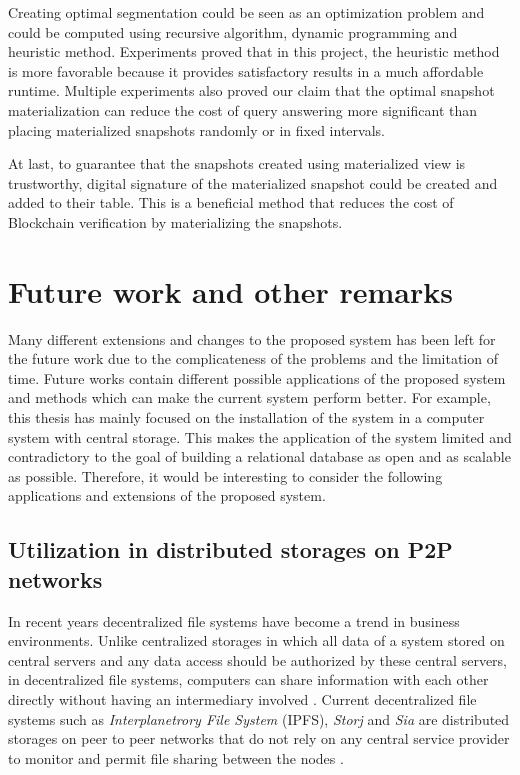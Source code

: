 		Creating optimal segmentation could be seen as an optimization problem and could be computed using recursive algorithm, dynamic programming and heuristic method. Experiments proved that in this project, the heuristic method is more favorable because it provides satisfactory results in a much affordable runtime. Multiple experiments also proved our claim that the optimal snapshot materialization can reduce the cost of query answering more significant than placing materialized snapshots randomly or in fixed intervals.

		At last, to guarantee that the snapshots created using materialized view is trustworthy, digital signature of the materialized snapshot could be created and added to their table. This is a beneficial method that reduces the cost of Blockchain verification by materializing the snapshots.

	\section{Future work and other remarks}
		Many different extensions and changes to the proposed system has been left for the future work due to the complicateness of the problems and the limitation of time. Future works contain different possible applications of the proposed system and methods which can make the current system perform better. For example, this thesis has mainly focused on the installation of the system in a computer system with central storage. This makes the application of the system limited and contradictory to the goal of building a relational database as open and as scalable as possible. Therefore, it would be interesting to consider the following applications and extensions of the proposed system.
		\subsection {Utilization in distributed storages on P2P networks}
			In recent years decentralized file systems have become a trend in business environments. Unlike centralized storages in which all data of a system stored on central servers and any data access should be authorized by these central servers, in decentralized file systems, computers can share information with each other directly without having an intermediary involved \cite{koonce2016thewild}. Current decentralized file systems such as {\it Interplanetrory File System} (IPFS), {\it Storj} and {\it Sia} are distributed storages on peer to peer networks that do not rely on any central service provider to monitor and permit file sharing between the nodes \cite{wang2018ablockchain}. 


